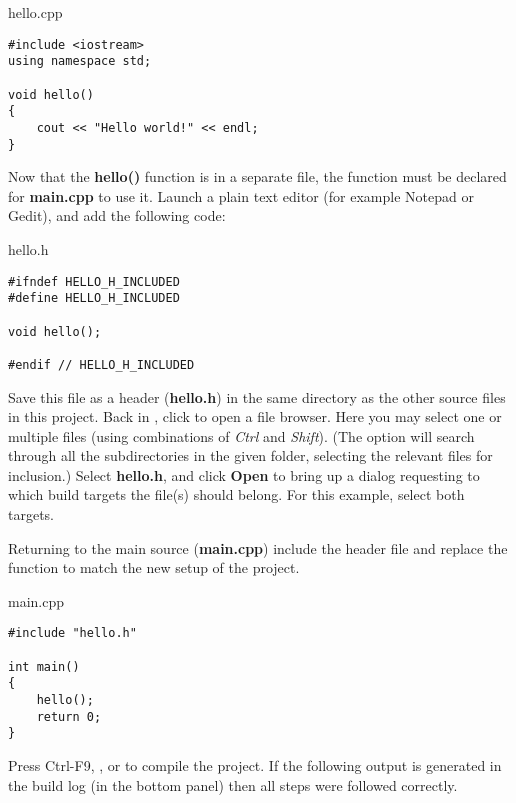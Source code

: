 hello.cpp
\begin{lstlisting}
#include <iostream>    
using namespace std;
  
void hello()
{
    cout << "Hello world!" << endl;
} 
\end{lstlisting}



Now that the \textbf{hello()} function is in a separate file, the function must be declared for \textbf{main.cpp} to use it. Launch a plain text editor (for example Notepad or Gedit), and add the following code:

hello.h 
\begin{lstlisting}
#ifndef HELLO_H_INCLUDED
#define HELLO_H_INCLUDED
     
void hello();
     
#endif // HELLO_H_INCLUDED
\end{lstlisting}

Save this file as a header (\textbf{hello.h}) in the same directory as the other source files in this project. Back in \codeblocks, click  to open a file browser. Here you may select one or multiple files (using combinations of \textit{Ctrl} and \textit{Shift}). (The option  will search through all the subdirectories in the given folder, selecting the relevant files for inclusion.) Select \textbf{hello.h}, and click \textbf{Open} to bring up a dialog requesting to which build targets the file(s) should belong. For this example, select both targets. 



Returning to the main source (\textbf{main.cpp}) include the header file and replace the  function to match the new setup of the project.

main.cpp
\begin{lstlisting}
#include "hello.h"

int main()
{
    hello();
    return 0;
}
\end{lstlisting}

Press Ctrl-F9, , or  to compile the project. If the following output is generated in the build log (in the bottom panel) then all steps were followed correctly.

